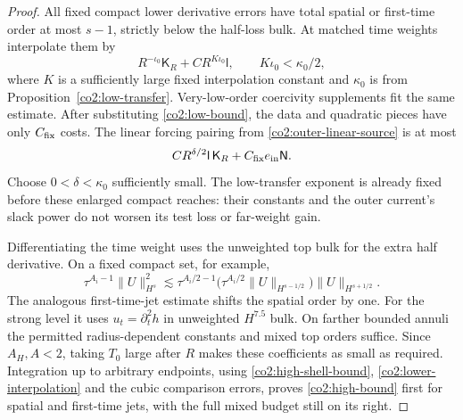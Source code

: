 \begin{proof}
All fixed compact lower derivative errors have total spatial or first-time
order at most $s-1$, strictly below the half-loss bulk.  At matched time
weights interpolate them by
\begin{equation}\label{co2:lower-interpolation}
 R^{-\iota_0}\mathsf K_R+C R^{K\iota_0}\mathsf l,
 \qquad K\iota_0<\kappa_0/2,
\end{equation}
where $K$ is a sufficiently large fixed interpolation constant and
$\kappa_0$ is from Proposition~\ref{co2:low-transfer}.  Very-low-order
coercivity supplements fit the same estimate.  After substituting
\eqref{co2:low-bound}, the data and quadratic pieces have only
$C_{\rm fix}$ costs.  The linear forcing pairing from
\eqref{co2:outer-linear-source} is at most
\[
 C R^{\delta/2}\mathsf l\,\mathsf K_R
       +C_{\rm fix}e_{\rm in}\mathsf N.
\]
Choose $0<\delta<\kappa_0$ sufficiently small.  The low-transfer exponent
is already fixed before these enlarged compact reaches: their constants and
the outer current's slack power do not worsen its test loss or far-weight
gain.

Differentiating the time weight uses the unweighted top bulk for the extra
half derivative.  On a fixed compact set, for example,
\begin{equation}\label{co2:plateau-interpolation}
 \tau^{A_i-1}\|U\|_{H^s}^2
 \lesssim\tau^{A_i/2-1}
       \bigl(\tau^{A_i/2}\|U\|_{H^{s-1/2}}\bigr)
       \|U\|_{H^{s+1/2}}.
\end{equation}
The analogous first-time-jet estimate shifts the spatial order by one.
For the strong level it uses $u_t=\partial_t^2h$ in unweighted
$H^{7.5}$ bulk.  On farther bounded annuli the permitted radius-dependent
constants and mixed top orders suffice.  Since $A_H,A<2$, taking $T_0$
large after $R$ makes these coefficients as small as required.  Integration
up to arbitrary endpoints, using \eqref{co2:high-shell-bound},
\eqref{co2:lower-interpolation} and the cubic comparison errors, proves
\eqref{co2:high-bound} first for spatial and first-time jets, with the full
mixed budget still on its right.


\end{proof}
